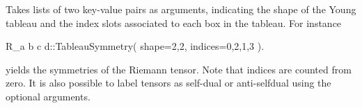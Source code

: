 
Takes lists of two key-value pairs as arguments, indicating the 
shape of the Young tableau and the index slots associated to each box
in the tableau. For instance
\begin{screen}{1}
R_{a b c d}::TableauSymmetry( shape={2,2}, indices={0,2,1,3} ).
\end{screen}
yields the symmetries of the Riemann tensor. Note that indices are
counted from zero. It is also possible to label tensors as self-dual
or anti-selfdual using the optional arguments.
